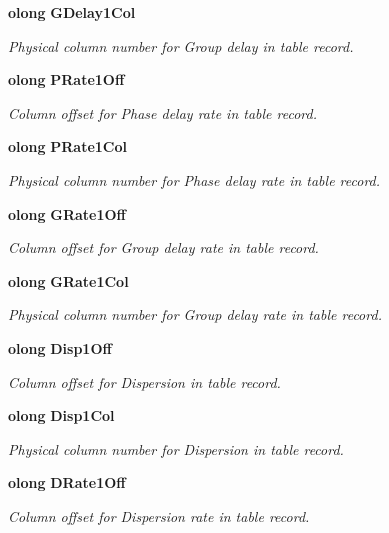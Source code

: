 \begin{CompactItemize}
{\bf olong} {\bf GDelay1Col}
\begin{CompactList}\small\item\em Physical column number for Group delay in table record. \item\end{CompactList}\item 
{\bf olong} {\bf PRate1Off}
\begin{CompactList}\small\item\em Column offset for Phase delay rate in table record. \item\end{CompactList}\item 
{\bf olong} {\bf PRate1Col}
\begin{CompactList}\small\item\em Physical column number for Phase delay rate in table record. \item\end{CompactList}\item 
{\bf olong} {\bf GRate1Off}
\begin{CompactList}\small\item\em Column offset for Group delay rate in table record. \item\end{CompactList}\item 
{\bf olong} {\bf GRate1Col}
\begin{CompactList}\small\item\em Physical column number for Group delay rate in table record. \item\end{CompactList}\item 
{\bf olong} {\bf Disp1Off}
\begin{CompactList}\small\item\em Column offset for Dispersion in table record. \item\end{CompactList}\item 
{\bf olong} {\bf Disp1Col}
\begin{CompactList}\small\item\em Physical column number for Dispersion in table record. \item\end{CompactList}\item 
{\bf olong} {\bf DRate1Off}
\begin{CompactList}\small\item\em Column offset for Dispersion rate in table record. \item\end{CompactList}\item 

\end{CompactItemize}
